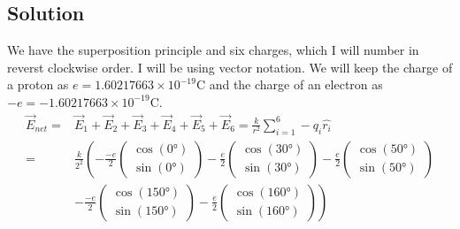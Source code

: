 \documentclass[12pt]{article}
\begin{document}
\subsection*{Solution}
We have the superposition principle and six charges, which I will number in reverst clockwise order. I will be using vector notation. We will keep the charge of a proton as $e = 1.60217663 \times 10^{-19} \unit{\coulomb}$ and the charge of an electron as $-e = -1.60217663 \times 10^{-19} \unit{\coulomb}$.
\begin{align*}
    \vec{E}_{net}   =&  \vec{E}_1 + \vec{E}_2 + \vec{E}_3 + \vec{E}_4 + \vec{E}_5 + \vec{E}_6
        =   \frac{k}{r^2}\sum_{i=1}^{6} - q_i \hat{r_i}\\
        =&  \frac{k}{2^2}\left(-\frac{-e}{2}\begin{pmatrix}\cos(0\unit{\degree})\\ \sin(0\unit{\degree})\end{pmatrix}
            - \frac{e}{2}\begin{pmatrix}\cos(30\unit{\degree})\\ \sin(30\unit{\degree})\end{pmatrix}
            - \frac{e}{2}\begin{pmatrix}\cos(50\unit{\degree})\\ \sin(50\unit{\degree})\end{pmatrix}\right. \\
            & \left. - \frac{-e}{2}\begin{pmatrix}\cos(150\unit{\degree})\\ \sin(150\unit{\degree})\end{pmatrix}
            - \frac{e}{2}\begin{pmatrix}\cos(160\unit{\degree})\\ \sin(160\unit{\degree})\end{pmatrix}\right)
\end{align*}
\end{document}
